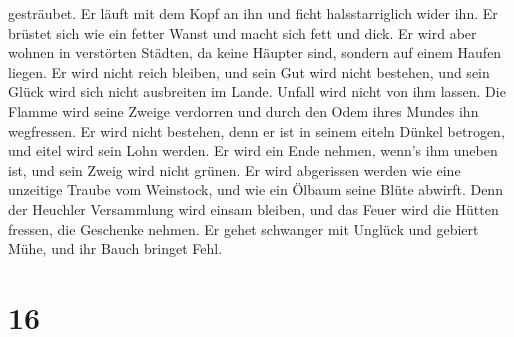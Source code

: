 gesträubet.  Er läuft mit dem Kopf an ihn und ficht
halsstarriglich wider ihn.  Er brüstet sich wie ein fetter
Wanst und macht sich fett und dick.  Er wird aber wohnen in
verstörten Städten, da keine Häupter sind, sondern auf einem Haufen
liegen.  Er wird nicht reich bleiben, und sein Gut wird
nicht bestehen, und sein Glück wird sich nicht ausbreiten im Lande.
 Unfall wird nicht von ihm lassen. Die Flamme wird seine
Zweige verdorren und durch den Odem ihres Mundes ihn wegfressen.
 Er wird nicht bestehen, denn er ist in seinem eiteln
Dünkel betrogen, und eitel wird sein Lohn werden.  Er wird
ein Ende nehmen, wenn's ihm uneben ist, und sein Zweig wird nicht
grünen.  Er wird abgerissen werden wie eine unzeitige
Traube vom Weinstock, und wie ein Ölbaum seine Blüte abwirft.
 Denn der Heuchler Versammlung wird einsam bleiben, und das
Feuer wird die Hütten fressen, die Geschenke nehmen.  Er
gehet schwanger mit Unglück und gebiert Mühe, und ihr Bauch bringet
Fehl.

\hypertarget{section-15}{%
\section{16}\label{section-15}}

